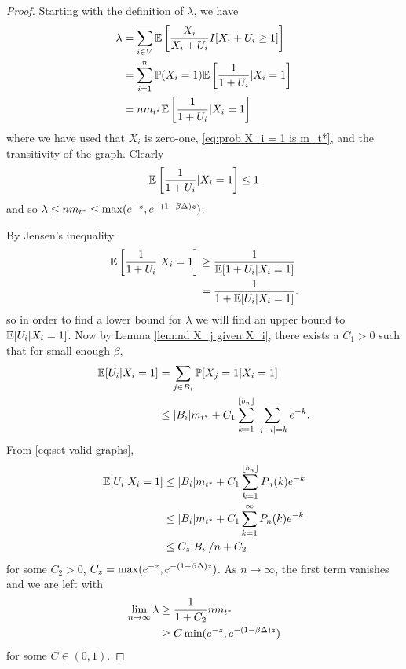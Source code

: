 	\begin{proof}
		Starting with the definition of $\lambda$, we have
		\begin{align}
			\lambda &= \sum_{i \in V} \mathbb{E}\left[\frac{X_i}{X_i + U_i} I[ X_i + U_i \geq 1] \right]\\
				&= \sum_{i = 1}^n \mathbb{P}(X_i = 1) \mathbb{E} \left[\frac{1}{1 + U_i}| X_i = 1\right]\\
				&= n m_{t^*} \mathbb{E} \left[\frac{1}{1 + U_i}| X_i = 1\right]
		\end{align}
		where we have used that $X_i$ is zero-one, \eqref{eq:prob X_i = 1 is m_t*}, and the transitivity of the graph.
		Clearly 
		\begin{align}
			\mathbb{E} \left[\frac{1}{1 + U_i}| X_i = 1\right] \leq 1
		\end{align}
		and so $\lambda \leq n m_{t^*} \leq \max(e^{-z}, e^{-(1 - \beta\Delta)z})$.

		By Jensen's inequality
		\begin{align}
			\mathbb{E} \left[\frac{1}{1 + U_i}| X_i = 1\right] &\geq \frac{1}{\mathbb{E}[1 + U_i | X_i = 1]}\\
				&= \frac{1}{1 + \mathbb{E}[U_i | X_i = 1]}.
		\end{align}
		so in order to find a lower bound for $\lambda$ we will find an upper bound to $\mathbb{E}[U_i | X_i = 1]$. Now by Lemma \ref{lem:nd X_j given X_i}, there exists a $C_1>0$ such that for small enough $\beta$,
		\begin{align}
			\mathbb{E}[U_i | X_i = 1] &= \sum_{j \in B_i} \mathbb{P}[X_j = 1| X_i = 1]\\
				& \leq |B_i| m_{t^*} + C_1\sum_{k=1}^{\lfloor b_n \rfloor} \sum_{|j - i| = k} e^{-k}.
		\end{align}
		From \eqref{eq:set valid graphs},
		\begin{align}
			\mathbb{E}[U_i | X_i = 1] &\leq |B_i|m_{t^*} + C_1 \sum_{k=1}^{\lfloor b_n \rfloor} P_n(k) e^{-k}\\
			&\leq |B_i|m_{t^*} + C_1 \sum_{k=1}^{\infty} P_n(k) e^{-k}\\
			&\leq C_z|B_i|/n + C_2
		\end{align}
		for some $C_2 > 0$, $C_z = \max(e^{-z}, e^{-(1 - \beta \Delta)z})$.
		As $n \rightarrow \infty$, the first term vanishes and we are left with \begin{align}
			\lim_{n \rightarrow \infty} \lambda &\geq \frac{1}{1 + C_2} n m_{t^*}\\
				&\geq C \min(e^{-z}, e^{-(1 - \beta\Delta)z}) 
		\end{align}
		for some $C \in (0, 1)$.
	\end{proof}

